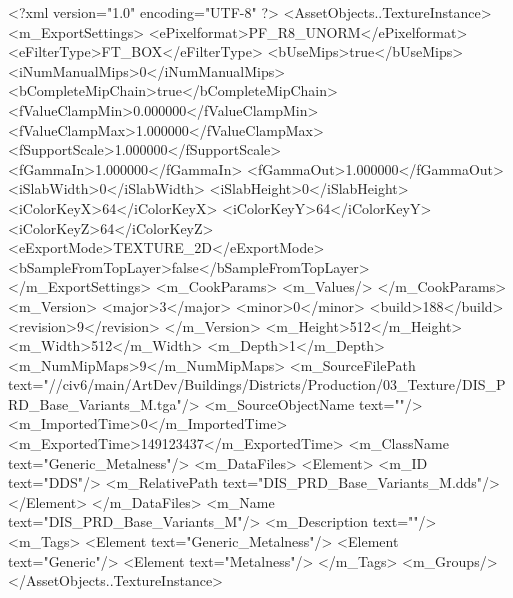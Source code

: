 <?xml version="1.0" encoding="UTF-8" ?>
<AssetObjects..TextureInstance>
	<m_ExportSettings>
		<ePixelformat>PF_R8_UNORM</ePixelformat>
		<eFilterType>FT_BOX</eFilterType>
		<bUseMips>true</bUseMips>
		<iNumManualMips>0</iNumManualMips>
		<bCompleteMipChain>true</bCompleteMipChain>
		<fValueClampMin>0.000000</fValueClampMin>
		<fValueClampMax>1.000000</fValueClampMax>
		<fSupportScale>1.000000</fSupportScale>
		<fGammaIn>1.000000</fGammaIn>
		<fGammaOut>1.000000</fGammaOut>
		<iSlabWidth>0</iSlabWidth>
		<iSlabHeight>0</iSlabHeight>
		<iColorKeyX>64</iColorKeyX>
		<iColorKeyY>64</iColorKeyY>
		<iColorKeyZ>64</iColorKeyZ>
		<eExportMode>TEXTURE_2D</eExportMode>
		<bSampleFromTopLayer>false</bSampleFromTopLayer>
	</m_ExportSettings>
	<m_CookParams>
		<m_Values/>
	</m_CookParams>
	<m_Version>
		<major>3</major>
		<minor>0</minor>
		<build>188</build>
		<revision>9</revision>
	</m_Version>
	<m_Height>512</m_Height>
	<m_Width>512</m_Width>
	<m_Depth>1</m_Depth>
	<m_NumMipMaps>9</m_NumMipMaps>
	<m_SourceFilePath text="//civ6/main/ArtDev/Buildings/Districts/Production/03_Texture/DIS_PRD_Base_Variants_M.tga"/>
	<m_SourceObjectName text=""/>
	<m_ImportedTime>0</m_ImportedTime>
	<m_ExportedTime>149123437</m_ExportedTime>
	<m_ClassName text="Generic_Metalness"/>
	<m_DataFiles>
		<Element>
			<m_ID text="DDS"/>
			<m_RelativePath text="DIS_PRD_Base_Variants_M.dds"/>
		</Element>
	</m_DataFiles>
	<m_Name text="DIS_PRD_Base_Variants_M"/>
	<m_Description text=""/>
	<m_Tags>
		<Element text="Generic_Metalness"/>
		<Element text="Generic"/>
		<Element text="Metalness"/>
	</m_Tags>
	<m_Groups/>
</AssetObjects..TextureInstance>

